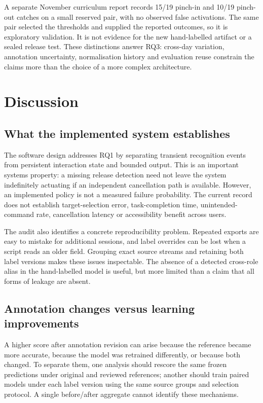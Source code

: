 A separate November curriculum report records 15/19 pinch-in and 10/19 pinch-out catches on a small reserved pair, with no observed false activations. The same pair selected the thresholds and supplied the reported outcomes, so it is exploratory validation. It is not evidence for the new hand-labelled artifact or a sealed release test. These distinctions answer RQ3: cross-day variation, annotation uncertainty, normalisation history and evaluation reuse constrain the claims more than the choice of a more complex architecture.

\section{Discussion}\label{discussion}

\subsection{What the implemented system establishes}\label{what-the-implemented-system-establishes}

The software design addresses RQ1 by separating transient recognition events from persistent interaction state and bounded output. This is an important systems property: a missing release detection need not leave the system indefinitely actuating if an independent cancellation path is available. However, an implemented policy is not a measured failure probability. The current record does not establish target-selection error, task-completion time, unintended-command rate, cancellation latency or accessibility benefit across users.

The audit also identifies a concrete reproducibility problem. Repeated exports are easy to mistake for additional sessions, and label overrides can be lost when a script reads an older field. Grouping exact source streams and retaining both label versions makes these issues inspectable. The absence of a detected cross-role alias in the hand-labelled model is useful, but more limited than a claim that all forms of leakage are absent.

\subsection{Annotation changes versus learning improvements}\label{annotation-changes-versus-learning-improvements}

A higher score after annotation revision can arise because the reference became more accurate, because the model was retrained differently, or because both changed. To separate them, one analysis should rescore the same frozen predictions under original and reviewed references; another should train paired models under each label version using the same source groups and selection protocol. A single before/after aggregate cannot identify these mechanisms.

